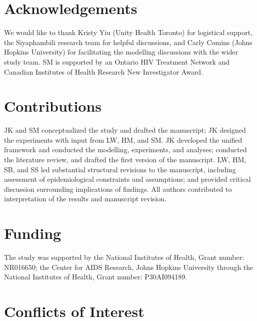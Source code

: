\section*{Acknowledgements}
We would like to thank
Kristy Yiu (Unity Health Toronto) for logistical support,
the Siyaphambili research team for helpful discussions,
and Carly Comins (Johns Hopkins University)
for facilitating the modelling discussions with the wider study team.
SM is supported by an Ontario HIV Treatment Network and
Canadian Institutes of Health Research New Investigator Award.
\section*{Contributions}
JK and SM conceptualized the study and drafted the manuscript;
JK designed the experiments with input from LW, HM, and SM.
JK developed the unified framework and conducted the modelling, experiments,
and analyses; conducted the literature review, and drafted the first version of the manuscript. 
LW, HM, SB, and SS led substantial structural
revisions to the manuscript, including assessment of epidemiological constraints and assumptions;
and provided critical discussion surrounding implications of findings.
All authors contributed to interpretation of the results and manuscript revision.
\section*{Funding}
The study was supported by
the National Institutes of Health, Grant number: NR016650;
the Center for AIDS Research, Johns Hopkins University
  through the National Institutes of Health, Grant number: P30AI094189.
\section*{Conflicts of Interest}

